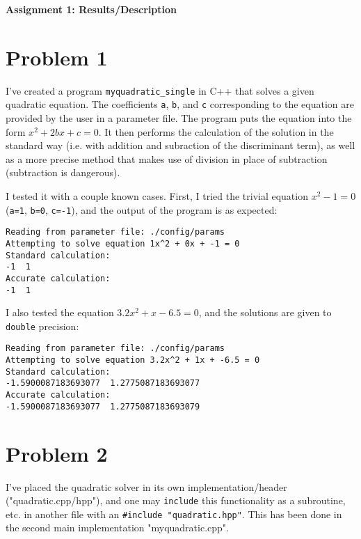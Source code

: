 \documentclass[12pt]{article}
\begin{document}
\begin{center}\begin{LARGE}
\textbf{Assignment 1: Results/Description}
\end{LARGE}\end{center}

\section*{Problem 1}

I've created a program \texttt{myquadratic\_single} in C++ that solves a given
quadratic equation. The coefficients \texttt{a}, \texttt{b}, and \texttt{c}
corresponding to the equation are provided by the user in a parameter file. The
program puts the equation into the form $x^2 + 2bx + c = 0$. It then performs
the calculation of the solution in the standard way (i.e. with addition and
subraction of the discriminant term), as well as a more precise method that
makes use of division in place of subtraction (subtraction is dangerous).

I tested it with a couple known cases. First, I tried the trivial equation
$x^2 - 1 = 0$ (\texttt{a=1}, \texttt{b=0}, \texttt{c=-1}), and the output of
the program is as expected:
\begin{verbatim}
Reading from parameter file: ./config/params
Attempting to solve equation 1x^2 + 0x + -1 = 0
Standard calculation:
-1  1
Accurate calculation:
-1  1
\end{verbatim}

I also tested the equation $3.2x^2 + x - 6.5 = 0$, and the solutions are given to
\texttt{double} precision:
\begin{verbatim}
Reading from parameter file: ./config/params
Attempting to solve equation 3.2x^2 + 1x + -6.5 = 0
Standard calculation:
-1.5900087183693077  1.2775087183693077
Accurate calculation:
-1.5900087183693077  1.2775087183693079
\end{verbatim}

\section*{Problem 2}

I've placed the quadratic solver in its own implementation/header ("quadratic.cpp/hpp"),
and one may \texttt{include} this functionality as a subroutine, etc. in another
file with an \texttt{\#include "quadratic.hpp"}. This has been done in the second main
implementation "myquadratic.cpp".
\end{document}
